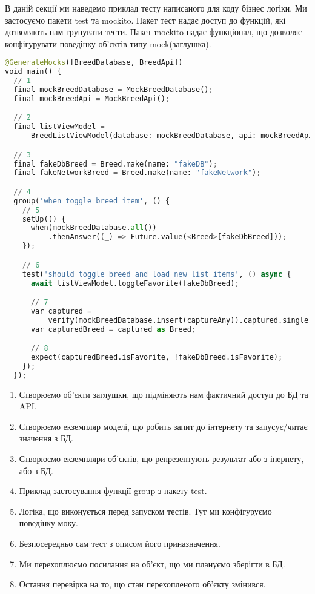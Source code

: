 В даній секції ми наведемо приклад тесту написаного для коду бізнес логіки.
Ми застосуємо пакети test та mockito.
Пакет тест надає доступ до функцій, які дозволяють нам групувати тести.
Пакет mockito надає функціонал, що дозволяє конфігурувати поведінку об'єктів типу mock(заглушка).
\begin{lstlisting}[style=light, language=Python,label={lst:flutter_unit_test},caption=Flutter Unit Test]
@GenerateMocks([BreedDatabase, BreedApi])
void main() {
  // 1
  final mockBreedDatabase = MockBreedDatabase();
  final mockBreedApi = MockBreedApi();

  // 2
  final listViewModel =
      BreedListViewModel(database: mockBreedDatabase, api: mockBreedApi);

  // 3
  final fakeDbBreed = Breed.make(name: "fakeDB");
  final fakeNetworkBreed = Breed.make(name: "fakeNetwork");

  // 4
  group('when toggle breed item', () {
    // 5
    setUp(() {
      when(mockBreedDatabase.all())
          .thenAnswer((_) => Future.value(<Breed>[fakeDbBreed]));
    });

    // 6
    test('should toggle breed and load new list items', () async {
      await listViewModel.toggleFavorite(fakeDbBreed);

      // 7
      var captured =
          verify(mockBreedDatabase.insert(captureAny)).captured.single;
      var capturedBreed = captured as Breed;

      // 8
      expect(capturedBreed.isFavorite, !fakeDbBreed.isFavorite);
    });
  });
\end{lstlisting}

\begin{enumerate}
    \item Створюємо об'єкти заглушки, що підміняють нам фактичний доступ до БД та API.
    \item Створюємо екземпляр моделі, що робить запит до інтернету та запусує/читає значення з БД.
    \item Створюємо екземпляри об'єктів, що репрезентують результат або з інернету, або з БД.
    \item Приклад застосування функції group з пакету test.
    \item Логіка, що виконується перед запуском тестів. Тут ми конфігуруємо поведінку моку.
    \item Безпосередньо сам тест з описом його приназначення.
    \item Ми перехоплюємо посилання на об'єкт, що ми плануємо зберігти в БД.
    \item Остання перевірка на то, що стан перехопленого об'єкту змінився.
\end{enumerate}

